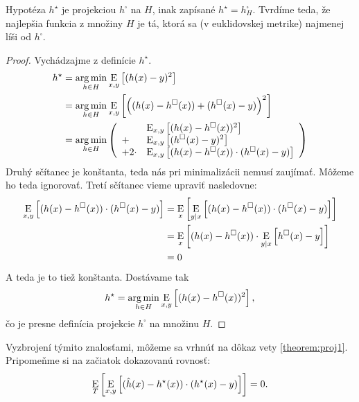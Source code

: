 \begin{lemma} \label{lem:hsq}
  Hypotéza $h^\star$ je projekciou $h^\square$ na $H$, inak zapísané
  $h^\star = h^\square_H$. Tvrdíme teda, že najlepšia funkcia z množiny
  $H$ je tá, ktorá sa (v euklidovskej metrike) najmenej líši od $h^\square$.
\end{lemma}
\begin{proof}
  Vychádzajme z definície $h^\star$.
  \begin{align}
    h^\star
      &= \operatorname*{arg\,min}_{h \in H} \operatorname*{\mathrm{E}}_{x,y} \left[ (h(x) - y)^2 \right] \\
      &= \operatorname*{arg\,min}_{h \in H} \operatorname*{\mathrm{E}}_{x,y} \left[ \left( (h(x) - h^\square(x)) + (h^\square(x) - y) \right)^2 \right] \\
      &= \operatorname*{arg\,min}_{h \in H} \left(
        \begin{array}{ll}
          &\operatorname*{\mathrm{E}}_{x,y} \left[ (h(x) - h^\square(x))^2 \right] \\
          + &\operatorname*{\mathrm{E}}_{x,y} \left[ (h^\square(x) - y)^2 \right] \\
          + 2 \cdot &\operatorname*{\mathrm{E}}_{x,y} \left[ (h(x) - h^\square(x)) \cdot (h^\square(x) - y) \right]
        \end{array}
        \right)
  \end{align}
  Druhý sčítanec je konštanta, teda nás pri minimalizácii nemusí zaujímať.
  Môžeme ho teda ignorovať. Tretí sčítanec vieme upraviť nasledovne:
  \begin{align}
    \operatorname*{\mathrm{E}}_{x,y} \left[ (h(x) - h^\square(x)) \cdot (h^\square(x) - y) \right]
      &= \operatorname*{\mathrm{E}}_x \left[ \operatorname*{\mathrm{E}}_{y|x} \left[ (h(x) - h^\square(x)) \cdot (h^\square(x) - y) \right] \right] \\
      &= \operatorname*{\mathrm{E}}_x \left[ (h(x) - h^\square(x)) \cdot \operatorname*{\mathrm{E}}_{y|x} \left[ h^\square(x) - y \right] \right] \\
      &= 0
  \end{align}
  A teda je to tiež konštanta. Dostávame tak
  $$h^\star = \operatorname*{arg\,min}_{h \in H} \operatorname*{\mathrm{E}}_{x,y} \left[ (h(x) - h^\square(x))^2 \right],$$
  čo je presne definícia projekcie $h^\square$ na množinu $H$.
\end{proof}

Vyzbrojení týmito znalosťami, môžeme sa vrhnúť na dôkaz vety \ref{theorem:proj1}.
Pripomeňme si na začiatok dokazovanú rovnosť:
$$\operatorname*{\mathrm{E}}_T \left[ \operatorname*{\mathrm{E}}_{x, y} \left[ (\hat{h}(x) - h^\star(x)) \cdot (h^\star(x) - y) \right] \right] = 0.$$


